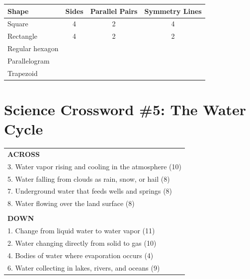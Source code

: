 \documentclass[
    language=english,
    doctype=activity-book,
    institution=none,
]{../../omnilatex}
\begin{document}
\begin{center}
\begin{tabular}{|l|c|c|c|}
\hline
\textbf{Shape} & \textbf{Sides} & \textbf{Parallel Pairs} & \textbf{Symmetry Lines} \\
\hline
Square & 4 & 2 & 4 \\
\hline
Rectangle & 4 & 2 & 2 \\
\hline
Regular hexagon & \underline{\hspace{1cm}} & \underline{\hspace{1cm}} & \underline{\hspace{1cm}} \\
\hline
Parallelogram & \underline{\hspace{1cm}} & \underline{\hspace{1cm}} & \underline{\hspace{1cm}} \\
\hline
Trapezoid & \underline{\hspace{1cm}} & \underline{\hspace{1cm}} & \underline{\hspace{1cm}} \\
\hline
\end{tabular}
\end{center}

\section{Science Crossword \#5: The Water Cycle}

\begin{center}
\begin{tabular}{|p{8cm}|}
\hline
\textbf{ACROSS} \\
3. Water vapor rising and cooling in the atmosphere \underline{\hspace{3cm}} (10) \\
5. Water falling from clouds as rain, snow, or hail \underline{\hspace{3cm}} (8) \\
7. Underground water that feeds wells and springs \underline{\hspace{3cm}} (8) \\
8. Water flowing over the land surface \underline{\hspace{3cm}} (8) \\
\\
\textbf{DOWN} \\
1. Change from liquid water to water vapor \underline{\hspace{3cm}} (11) \\
2. Water changing directly from solid to gas \underline{\hspace{3cm}} (10) \\
4. Bodies of water where evaporation occurs \underline{\hspace{3cm}} (4) \\
6. Water collecting in lakes, rivers, and oceans \underline{\hspace{3cm}} (9) \\
\hline
\end{tabular}
\end{center}
\end{document}
